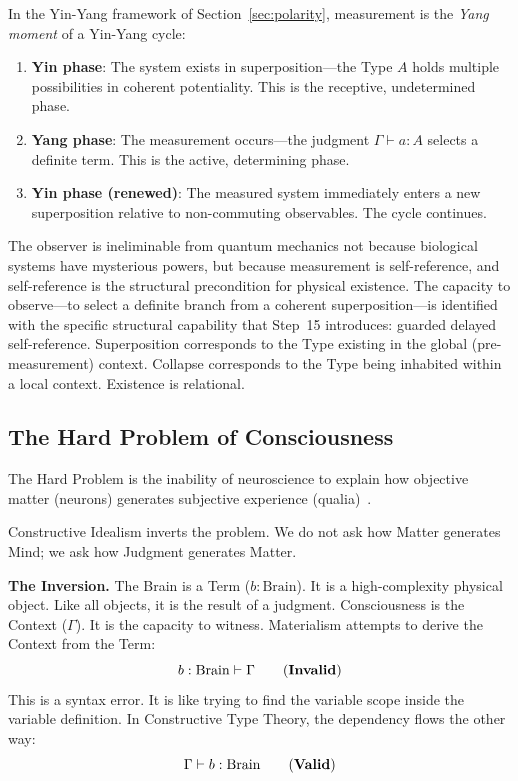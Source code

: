 \documentclass[12pt,a4paper]{article}
\newcommand{\turnstile}{\vdash}
\begin{document}
In the Yin-Yang framework of Section~\ref{sec:polarity}, measurement is the \emph{Yang moment} of a Yin-Yang cycle:
\begin{enumerate}[label=(\roman*)]
\item \textbf{Yin phase}: The system exists in superposition---the Type $A$ holds multiple possibilities in coherent potentiality. This is the receptive, undetermined phase.
\item \textbf{Yang phase}: The measurement occurs---the judgment $\Gamma \turnstile a : A$ selects a definite term. This is the active, determining phase.
\item \textbf{Yin phase (renewed)}: The measured system immediately enters a new superposition relative to non-commuting observables. The cycle continues.
\end{enumerate}

The observer is ineliminable from quantum mechanics not because biological systems have mysterious powers, but because measurement is self-reference, and self-reference is the structural precondition for physical existence. The capacity to observe---to select a definite branch from a coherent superposition---is identified with the specific structural capability that Step~15 introduces: guarded delayed self-reference. Superposition corresponds to the Type existing in the global (pre-measurement) context. Collapse corresponds to the Type being inhabited within a local context. Existence is relational.


\subsection{The Hard Problem of Consciousness}
\label{sec:consciousness}

The Hard Problem is the inability of neuroscience to explain how objective matter (neurons) generates subjective experience (qualia)~\cite{chalmers}.

Constructive Idealism inverts the problem. We do not ask how Matter generates Mind; we ask how Judgment generates Matter.

\textbf{The Inversion.} The Brain is a Term ($b : \mathrm{Brain}$). It is a high-complexity physical object. Like all objects, it is the result of a judgment. Consciousness is the Context ($\Gamma$). It is the capacity to witness. Materialism attempts to derive the Context from the Term:
\begin{equation}
b : \mathrm{Brain} \turnstile \Gamma \qquad \text{(\textbf{Invalid})}
\label{eq:invalid}
\end{equation}
This is a syntax error. It is like trying to find the variable scope inside the variable definition. In Constructive Type Theory, the dependency flows the other way:
\begin{equation}
\Gamma \turnstile b : \mathrm{Brain} \qquad \text{(\textbf{Valid})}
\label{eq:valid}
\end{equation}
\end{document}
